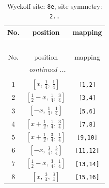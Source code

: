 \documentclass[fleqn,8pt]{jsarticle}
\begin{document}
\begin{longtable}{ccc}
\caption{Wyckoff site: {\tt 8e}, site symmetry: {\tt 2..}}
 \\
 \hline \hline
No. & position & mapping \\ \hline \endfirsthead

\multicolumn{2}{l}{\tablename\ \thetable{}} \\
 \hline \hline
No. & position & mapping \\ \hline \endhead

 \hline \hline
\multicolumn{2}{r}{\footnotesize\it continued ...} \\ \endfoot

 \hline \hline
\multicolumn{2}{r}{} \\ \endlastfoot

1 & $\left[ x,\, \frac{1}{4},\, \frac{1}{4} \right]$ & {\tt [1,2]} \\ \hline
2 & $\left[ \frac{1}{2} - x,\, \frac{1}{4},\, \frac{3}{4} \right]$ & {\tt [3,4]} \\ \hline
3 & $\left[ - x,\, \frac{1}{4},\, \frac{1}{4} \right]$ & {\tt [5,6]} \\ \hline
4 & $\left[ x + \frac{1}{2},\, \frac{1}{4},\, \frac{3}{4} \right]$ & {\tt [7,8]} \\ \hline
5 & $\left[ x + \frac{1}{2},\, \frac{3}{4},\, \frac{1}{4} \right]$ & {\tt [9,10]} \\ \hline
6 & $\left[ - x,\, \frac{3}{4},\, \frac{3}{4} \right]$ & {\tt [11,12]} \\ \hline
7 & $\left[ \frac{1}{2} - x,\, \frac{3}{4},\, \frac{1}{4} \right]$ & {\tt [13,14]} \\ \hline
8 & $\left[ x,\, \frac{3}{4},\, \frac{3}{4} \right]$ & {\tt [15,16]} \\
\end{longtable}
\renewcommand{\arraystretch}{1.2}
\end{document}
